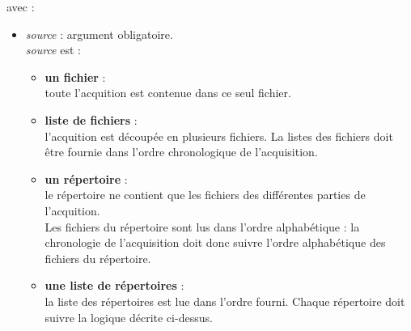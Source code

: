 \medskip
avec :
\begin{itemize}
\item[•] \textit{source} : argument obligatoire. \\
         \textit{source} est :
    \begin{itemize}
      \item \textbf {un fichier} : \\
            toute l'acquition est contenue dans ce seul fichier.
      \item \textbf {liste de fichiers} : \\
            l'acquition est découpée en plusieurs fichiers. La listes des
            fichiers doit être fournie dans l'ordre chronologique de
            l'acquisition.
      \item \textbf {un répertoire} : \\
            le répertoire ne contient que les fichiers des différentes
            parties de l'acquition. \\
            Les fichiers du répertoire sont lus dans l'ordre
            alphabétique : la chronologie de l'acquisition doit donc
            suivre l'ordre alphabétique des fichiers du répertoire.
      \item \textbf {une liste de répertoires} : \\
            la liste des répertoires est lue dans l'ordre fourni. Chaque
            répertoire doit suivre la logique décrite ci-dessus.
    \end{itemize}


\end{itemize}
